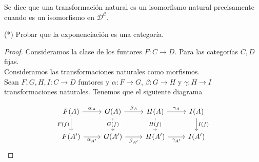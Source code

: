     \begin{defn}
        Se dice que una transformación natural es un isomorfismo natural precisamente cuando es un isomorfismo en $\mathcal{D^C}$.
    \end{defn}
    \begin{exe}%
    (*) Probar que la exponenciación es una categoría.
\end{exe}
\begin{proof}
  Consideramos la clase de los funtores $F\colon C\to D$. Para las categorías $C,D$ fijas.\\
Consideramos las transformaciones naturales como morfismos.\\
Sean $F,G,H,I:C\to D$ funtores y $\alpha\colon F\to G$, $\beta\colon G\to H$ y $\gamma\colon H\to I$ transformaciones naturales. Tenemos que el siguiente diagrama

\[
\begin{tikzcd}
F(A) \arrow[d, "F(f)"'] \arrow[r, "\alpha_A"] & G(A) \arrow[d, "G(f)" description] \arrow[r, "\beta_A"] & H(A) \arrow[d, "H(f)" description] \arrow[r, "\gamma_A"] & I(A) \arrow[d, "I(f)"] \\
F(A') \arrow[r, "\alpha_{A'}"']               & G(A') \arrow[r, "\beta_{A'}"']                          & H(A') \arrow[r, "\gamma_{A'}"']                          & I(A')                 
\end{tikzcd}
\]


\end{proof}
